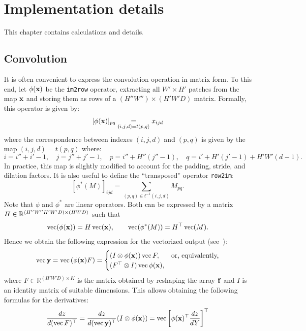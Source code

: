 \section{Implementation details}\label{s:impl}

This chapter contains calculations and details.

\subsection{Convolution}\label{s:impl-convolution}

It is often convenient to express the convolution operation in matrix form. To this end, let $\phi(\mathbf{x})$ be the \verb!im2row! operator, extracting all $W' \times H'$ patches from the map $\mathbf{x}$ and storing them as rows of a $(H''W'') \times (H'W'D)$ matrix. Formally, this operator is given by:
\[
[\phi(\mathbf{x})]_{pq} \underset{(i,j,d)=t(p,q)}{=} x_{ijd}
\]
where the correspondence between indexes $(i,j,d)$ and $(p,q)$ is given by the map $(i,j,d) = t(p,q)$ where:
\[
i = i''+i'-1, \quad
j = j''+j'-1, \quad
p = i'' + H'' (j''-1), \quad
q = i' + H'(j'-1) + H'W' (d-1).
\]
In practice, this map is slightly modified to account for the padding, stride, and dilation factors. It is also useful to define the ``transposed'' operator \verb!row2im!:
\[
[\phi^*(M)]_{ijd}
=
\sum_{(p,q) \in t^{-1}(i,j,d)}
M_{pq}.
\]
Note that $\phi$ and $\phi^*$ are linear operators. Both can be expressed by a matrix $H\in\mathbb{R}^{(H''W''H'W'D) \times(HWD)}$ such that
\[
\operatorname{vec}(\phi(\mathbf{x})) = H \operatorname{vec}(\mathbf{x}), \qquad 
\operatorname{vec}(\phi^*(M)) = H^\top \operatorname{vec}(M).
\]
Hence we obtain the following expression for the vectorized output (see~\cite{kinghorn96integrals}):
\[
\operatorname{vec}\mathbf{y} = 
\operatorname{vec}\left(\phi(\mathbf{x}) F\right)
=
\begin{cases}
(I \otimes \phi(\mathbf{x})) \operatorname{vec} F, & \text{or, equivalently,} \\
(F^\top \otimes I) \operatorname{vec} \phi(\mathbf{x}),
\end{cases}
\]
where $F\in\mathbb{R}^{(H'W'D)\times K}$ is the matrix obtained by reshaping the array $\mathbf{f}$ and $I$ is an identity matrix of suitable dimensions. This allows obtaining the following formulas for the derivatives:
\[
\frac{dz}{d(\operatorname{vec} F)^\top}
=
\frac{dz}{d(\operatorname{vec}\mathbf{y})^\top}
(I \otimes \phi(\mathbf{x}))
= \operatorname{vec}\left[ 
\phi(\mathbf{x})^\top 
\frac{dz}{dY}
\right]^\top
\]
